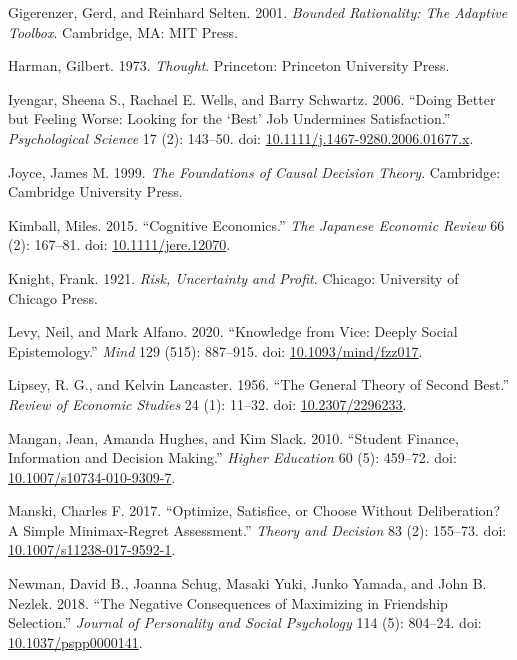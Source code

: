 \documentclass[
  11pt,
  letterpaper,
  DIV=11,
  numbers=noendperiod,
  twoside]{scrartcl}
\newlength{\cslhangindent}
\newenvironment{CSLReferences}[2] %
 {\begin{list}{}{%
  \setlength{\itemindent}{0pt}
  \setlength{\leftmargin}{0pt}
  \setlength{\parsep}{0pt}
  \ifodd #1
   \setlength{\leftmargin}{\cslhangindent}
   \setlength{\itemindent}{-1\cslhangindent}
  \fi
  \setlength{\itemsep}{#2\baselineskip}}}
 {\end{list}}
\begin{document}
\begin{CSLReferences}{1}{0}
Gigerenzer, Gerd, and Reinhard Selten. 2001. \emph{Bounded Rationality:
The Adaptive Toolbox}. Cambridge, MA: MIT Press.

Harman, Gilbert. 1973. \emph{Thought}. Princeton: Princeton University
Press.

Iyengar, Sheena S., Rachael E. Wells, and Barry Schwartz. 2006. {``Doing
Better but Feeling Worse: Looking for the {`Best'} Job Undermines
Satisfaction.''} \emph{Psychological Science} 17 (2): 143--50. doi:
\href{https://doi.org/10.1111/j.1467-9280.2006.01677.x}{10.1111/j.1467-9280.2006.01677.x}.

Joyce, James M. 1999. \emph{The Foundations of Causal Decision Theory}.
Cambridge: Cambridge University Press.

Kimball, Miles. 2015. {``Cognitive Economics.''} \emph{The Japanese
Economic Review} 66 (2): 167--81. doi:
\href{https://doi.org/10.1111/jere.12070}{10.1111/jere.12070}.

Knight, Frank. 1921. \emph{Risk, Uncertainty and Profit}. Chicago:
University of Chicago Press.

Levy, Neil, and Mark Alfano. 2020. {``Knowledge from Vice: Deeply Social
Epistemology.''} \emph{Mind} 129 (515): 887--915. doi:
\href{https://doi.org/10.1093/mind/fzz017}{10.1093/mind/fzz017}.

Lipsey, R. G., and Kelvin Lancaster. 1956. {``The General Theory of
Second Best.''} \emph{Review of Economic Studies} 24 (1): 11--32. doi:
\href{https://doi.org/10.2307/2296233}{10.2307/2296233}.

Mangan, Jean, Amanda Hughes, and Kim Slack. 2010. {``Student Finance,
Information and Decision Making.''} \emph{Higher Education} 60 (5):
459--72. doi:
\href{https://doi.org/10.1007/s10734-010-9309-7}{10.1007/s10734-010-9309-7}.

Manski, Charles F. 2017. {``Optimize, Satisfice, or Choose Without
Deliberation? A Simple Minimax-Regret Assessment.''} \emph{Theory and
Decision} 83 (2): 155--73. doi:
\href{https://doi.org/10.1007/s11238-017-9592-1}{10.1007/s11238-017-9592-1}.

Newman, David B., Joanna Schug, Masaki Yuki, Junko Yamada, and John B.
Nezlek. 2018. {``The Negative Consequences of Maximizing in Friendship
Selection.''} \emph{Journal of Personality and Social Psychology} 114
(5): 804--24. doi:
\href{https://doi.org/10.1037/pspp0000141}{10.1037/pspp0000141}.


\end{CSLReferences}
\end{document}
